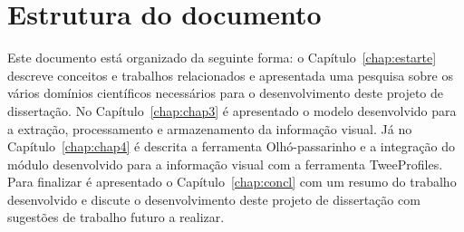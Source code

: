 \section{Estrutura do documento} \label{sec:struct}

Este documento está organizado da seguinte forma: o Capítulo~\ref{chap:estarte} descreve conceitos e trabalhos relacionados e apresentada uma pesquisa sobre os vários domínios científicos necessários para o desenvolvimento deste projeto de dissertação. No Capítulo~\ref{chap:chap3} é apresentado o modelo desenvolvido para a extração, processamento e armazenamento da informação visual. Já no Capítulo~\ref{chap:chap4} é descrita a ferramenta Olhó-passarinho e a integração do módulo desenvolvido para a informação visual com a ferramenta TweeProfiles. Para finalizar é apresentado o Capítulo~\ref{chap:concl} com um resumo do trabalho desenvolvido e discute o desenvolvimento deste projeto de dissertação com sugestões de trabalho futuro a realizar.
